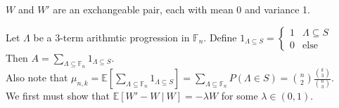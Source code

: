\documentclass[12pt]{article} %
\newcommand{\E}{\mathbb{E}}
\newcommand{\F}{\mathbb{F}}
\theoremstyle{definition}
\theoremstyle{remark}
\begin{document}
\remark $W$ and $W'$ are an exchangeable pair, each with mean 0 and variance 1. 

Let $\Lambda$ be a 3-term arithmtic progression  in $\F_n$. Define $1_{\Lambda \subseteq S} = 
\begin{cases} 
      1 & \Lambda \subseteq S \\
      0 & \text{else}
\end{cases}$ \\
Then $A = \sum_{\Lambda \subseteq \F_n} 1_{\Lambda \subseteq S}$. \\
Also note that $\mu_{n,k} = \E[\sum_{\Lambda \subseteq \F_n} 1_{\Lambda \subseteq S}] = \sum_{\Lambda \subseteq \F_n} P(\Lambda \in S) = \binom{n}{2}\frac{\binom{k}{3}}{\binom{n}{3}}$. \\

We first must show that $\E[W'-W\ |\ W] = -\lambda W$ for some $\lambda \in (0,1)$. 
\end{document}
